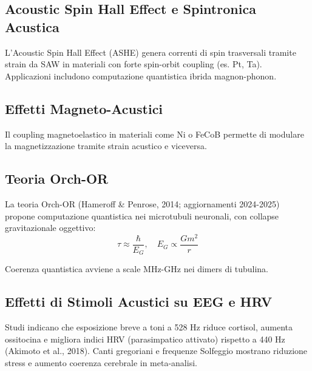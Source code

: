 \documentclass[11pt,a4paper]{article}
\begin{document}
\subsection{Acoustic Spin Hall Effect e Spintronica Acustica}
L'Acoustic Spin Hall Effect (ASHE) genera correnti di spin trasversali tramite strain da SAW in materiali con forte spin-orbit coupling (es. Pt, Ta). Applicazioni includono computazione quantistica ibrida magnon-phonon.

\subsection{Effetti Magneto-Acustici}
Il coupling magnetoelastico in materiali come Ni o FeCoB permette di modulare la magnetizzazione tramite strain acustico e viceversa.

\subsection{Teoria Orch-OR}
La teoria Orch-OR (Hameroff \& Penrose, 2014; aggiornamenti 2024-2025) propone computazione quantistica nei microtubuli neuronali, con collapse gravitazionale oggettivo:
\begin{equation}
\tau \approx \frac{\hbar}{E_G}, \quad E_G \propto \frac{G m^2}{r}
\end{equation}

Coerenza quantistica avviene a scale MHz-GHz nei dimers di tubulina.

\subsection{Effetti di Stimoli Acustici su EEG e HRV}
Studi indicano che esposizione breve a toni a 528 Hz riduce cortisol, aumenta ossitocina e migliora indici HRV (parasimpatico attivato) rispetto a 440 Hz (Akimoto et al., 2018). Canti gregoriani e frequenze Solfeggio mostrano riduzione stress e aumento coerenza cerebrale in meta-analisi.
\end{document}
